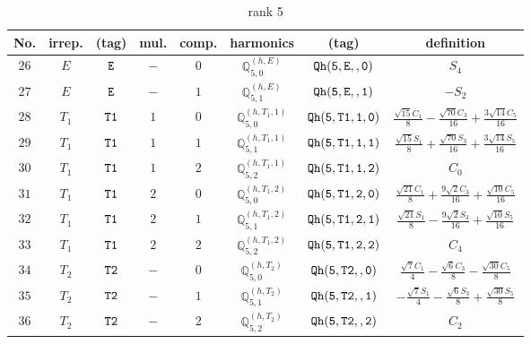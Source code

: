 \documentclass[fleqn,8pt]{jsarticle}
\begin{document}
\begin{table}[ht!]
\begin{center}
\caption{rank 5}
\renewcommand{\arraystretch}{1.3}
\begin{tabular}{cccccccc} \hline \hline
No. & irrep. & (tag) & mul. & comp. & harmonics & (tag) & definition \\ \hline
$ 26 $ & $ E $ & $ {\tt E} $ & $ - $ & $ 0 $ & $ \mathbb{Q}_{5,0}^{(h,E)} $ & $ {\tt Qh(5,E,,0)} $ & $ S_{4} $ \\
$ 27 $ & $ E $ & $ {\tt E} $ & $ - $ & $ 1 $ & $ \mathbb{Q}_{5,1}^{(h,E)} $ & $ {\tt Qh(5,E,,1)} $ & $ - S_{2} $ \\
$ 28 $ & $ T_{1} $ & $ {\tt T1} $ & $ 1 $ & $ 0 $ & $ \mathbb{Q}_{5,0}^{(h,T_{1},1)} $ & $ {\tt Qh(5,T1,1,0)} $ & $ \frac{\sqrt{15} C_{1}}{8} - \frac{\sqrt{70} C_{3}}{16} + \frac{3 \sqrt{14} C_{5}}{16} $ \\
$ 29 $ & $ T_{1} $ & $ {\tt T1} $ & $ 1 $ & $ 1 $ & $ \mathbb{Q}_{5,1}^{(h,T_{1},1)} $ & $ {\tt Qh(5,T1,1,1)} $ & $ \frac{\sqrt{15} S_{1}}{8} + \frac{\sqrt{70} S_{3}}{16} + \frac{3 \sqrt{14} S_{5}}{16} $ \\
$ 30 $ & $ T_{1} $ & $ {\tt T1} $ & $ 1 $ & $ 2 $ & $ \mathbb{Q}_{5,2}^{(h,T_{1},1)} $ & $ {\tt Qh(5,T1,1,2)} $ & $ C_{0} $ \\
$ 31 $ & $ T_{1} $ & $ {\tt T1} $ & $ 2 $ & $ 0 $ & $ \mathbb{Q}_{5,0}^{(h,T_{1},2)} $ & $ {\tt Qh(5,T1,2,0)} $ & $ \frac{\sqrt{21} C_{1}}{8} + \frac{9 \sqrt{2} C_{3}}{16} + \frac{\sqrt{10} C_{5}}{16} $ \\
$ 32 $ & $ T_{1} $ & $ {\tt T1} $ & $ 2 $ & $ 1 $ & $ \mathbb{Q}_{5,1}^{(h,T_{1},2)} $ & $ {\tt Qh(5,T1,2,1)} $ & $ \frac{\sqrt{21} S_{1}}{8} - \frac{9 \sqrt{2} S_{3}}{16} + \frac{\sqrt{10} S_{5}}{16} $ \\
$ 33 $ & $ T_{1} $ & $ {\tt T1} $ & $ 2 $ & $ 2 $ & $ \mathbb{Q}_{5,2}^{(h,T_{1},2)} $ & $ {\tt Qh(5,T1,2,2)} $ & $ C_{4} $ \\
$ 34 $ & $ T_{2} $ & $ {\tt T2} $ & $ - $ & $ 0 $ & $ \mathbb{Q}_{5,0}^{(h,T_{2})} $ & $ {\tt Qh(5,T2,,0)} $ & $ \frac{\sqrt{7} C_{1}}{4} - \frac{\sqrt{6} C_{3}}{8} - \frac{\sqrt{30} C_{5}}{8} $ \\
$ 35 $ & $ T_{2} $ & $ {\tt T2} $ & $ - $ & $ 1 $ & $ \mathbb{Q}_{5,1}^{(h,T_{2})} $ & $ {\tt Qh(5,T2,,1)} $ & $ - \frac{\sqrt{7} S_{1}}{4} - \frac{\sqrt{6} S_{3}}{8} + \frac{\sqrt{30} S_{5}}{8} $ \\
$ 36 $ & $ T_{2} $ & $ {\tt T2} $ & $ - $ & $ 2 $ & $ \mathbb{Q}_{5,2}^{(h,T_{2})} $ & $ {\tt Qh(5,T2,,2)} $ & $ C_{2} $ \\
 \hline \hline
\end{tabular}
\end{center}
\end{table}
\end{document}

